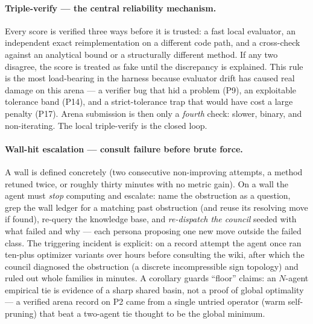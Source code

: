 \documentclass[11pt]{article}
\newcommand{\src}[1]{}
\begin{document}
\paragraph{Triple-verify --- the central reliability mechanism.}
Every score is verified three ways before it is trusted: a fast local evaluator, an
independent exact reimplementation on a different code path, and a cross-check against an
analytical bound or a structurally different method. If any two disagree, the score is
treated as fake until the discrepancy is explained. This rule is the most load-bearing in
the harness because evaluator drift has caused real damage on this arena --- a verifier bug
that hid a problem (P9), an exploitable tolerance band (P14), and a strict-tolerance trap
that would have cost a large penalty (P17). Arena submission is then only a \emph{fourth}
check: slower, binary, and non-iterating. The local triple-verify is the closed loop.
\src{.claude/rules/triple-verify.md, .claude/rules/axioms.md (A1)}

\paragraph{Wall-hit escalation --- consult failure before brute force.}
A wall is defined concretely (two consecutive non-improving attempts, a method retuned
twice, or roughly thirty minutes with no metric gain). On a wall the agent must
\emph{stop} computing and escalate: name the obstruction as a question, grep the wall
ledger for a matching past obstruction (and reuse its resolving move if found), re-query
the knowledge base, and \emph{re-dispatch the council} seeded with what failed and why ---
each persona proposing one new move outside the failed class. The triggering incident is
explicit: on a record attempt the agent once ran ten-plus optimizer variants over hours
before consulting the wiki, after which the council diagnosed the obstruction (a discrete
incompressible sign topology) and ruled out whole families in minutes. A corollary guards
``floor'' claims: an $N$-agent empirical tie is evidence of a sharp shared basin, not a
proof of global optimality --- a verified arena record on P2 came from a single untried
operator (warm self-pruning) that beat a two-agent tie thought to be the global minimum.
\src{.claude/rules/wall-hit-escalation.md, concepts/n-agent-tie-not-global-min}
\end{document}
